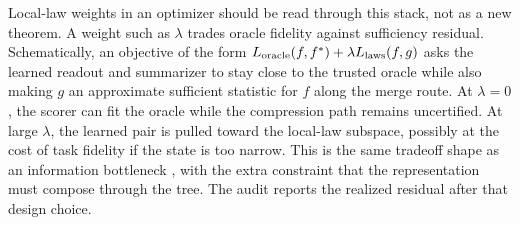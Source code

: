 Local-law weights in an optimizer should be read through this stack, not as a
new theorem. A weight such as $\lambda$ trades oracle fidelity against
sufficiency residual. Schematically, an objective of the form
$L_{\mathrm{oracle}}(f,f^\ast)+\lambda L_{\mathrm{laws}}(f,g)$ asks the learned
readout and summarizer to stay close to the trusted oracle while also making
$g$ an approximate sufficient statistic for $f$ along the merge route. At
$\lambda=0$, the scorer can fit the oracle while the compression path remains
uncertified. At large $\lambda$, the learned pair is pulled toward the
local-law subspace, possibly at the cost of task fidelity if the state is too
narrow. This is the same tradeoff shape as an information bottleneck
\citep{TishbyPereiraBialek1999}, with the extra constraint that the
representation must compose through the tree. The audit reports the realized
residual after that design choice.

